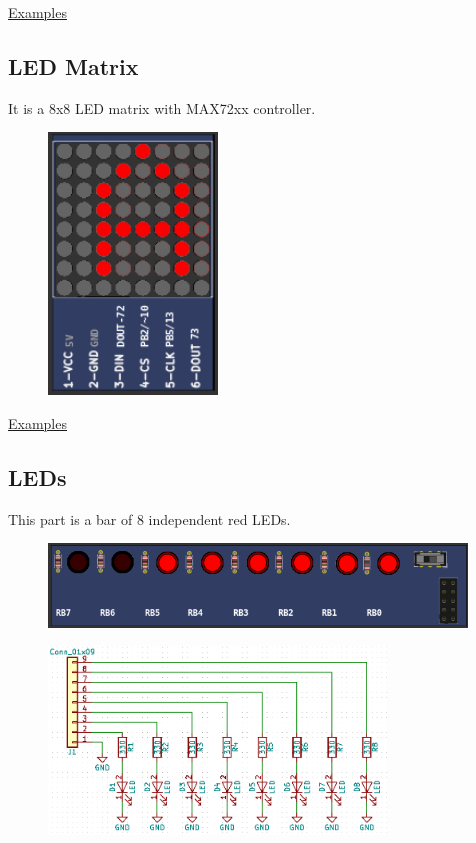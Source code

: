 \href{https://lcgamboa.github.io/picsimlab_examples/Parts.html\#LCD_ssd1306}{Examples}


\subsection{LED Matrix}

It is a 8x8 LED matrix with MAX72xx controller.

\begin{figure}[H]
\center
\includegraphics[width=0.4\textwidth]{img/part_LED_matrix.png} 
\end{figure}

\href{https://lcgamboa.github.io/picsimlab_examples/Parts.html\#LED_Matrix}{Examples}

\subsection{LEDs}

This part is a bar of 8 independent red LEDs.

\begin{figure}[H]
\center
\includegraphics[width=0.99\textwidth]{img/part_leds.png} 
\end{figure} 

\begin{figure}[H]
\center
\includegraphics[width=0.8\textwidth]{img/part_leds_.png} 
\end{figure} 

